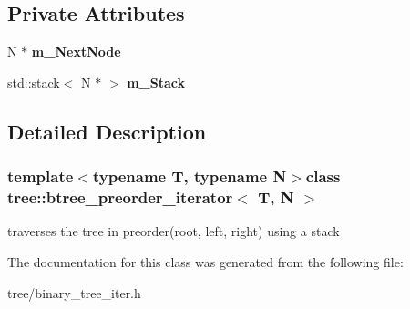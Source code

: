 \subsection*{\-Private \-Attributes}
\begin{DoxyCompactItemize}
\item 
\hypertarget{classtree_1_1btree__preorder__iterator_a142dc25e4c41f10c96cc738182d2eb18}{\-N $\ast$ {\bfseries m\-\_\-\-Next\-Node}}\label{classtree_1_1btree__preorder__iterator_a142dc25e4c41f10c96cc738182d2eb18}

\item 
\hypertarget{classtree_1_1btree__preorder__iterator_a790df750993384cb0c3056c0dd780cc0}{std\-::stack$<$ \-N $\ast$ $>$ {\bfseries m\-\_\-\-Stack}}\label{classtree_1_1btree__preorder__iterator_a790df750993384cb0c3056c0dd780cc0}

\end{DoxyCompactItemize}


\subsection{\-Detailed \-Description}
\subsubsection*{template$<$typename T, typename N$>$class tree\-::btree\-\_\-preorder\-\_\-iterator$<$ T, N $>$}

traverses the tree in preorder(root, left, right) using a stack 

\-The documentation for this class was generated from the following file\-:\begin{DoxyCompactItemize}
\item 
tree/binary\-\_\-tree\-\_\-iter.\-h\end{DoxyCompactItemize}
